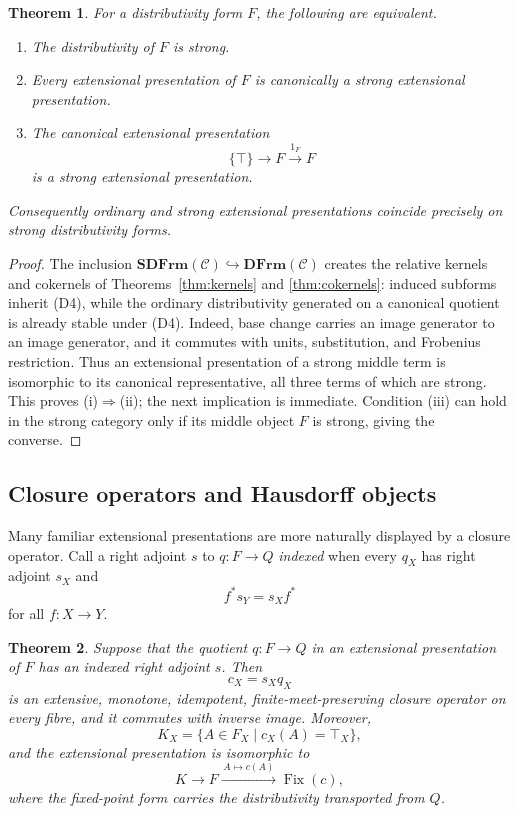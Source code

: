 \documentclass[12pt,oneside,reqno]{amsart}
\newtheorem{theorem}{Theorem}[section]
\theoremstyle{definition}
\theoremstyle{remark}
\newcommand{\C}{\mathcal C}
\newcommand{\DFrm}{\mathbf{DFrm}}
\newcommand{\SDFrm}{\mathbf{SDFrm}}
\begin{document}
\begin{theorem}\label{thm:ordinary-strong-presentations}
For a distributivity form \(F\), the following are equivalent.
\begin{enumerate}[label=\textup{(\roman*)}]
\item The distributivity of \(F\) is strong.
\item Every extensional presentation of \(F\) is canonically a strong
extensional presentation.
\item The canonical extensional presentation
\[
       \{\top\}\longrightarrow F\xrightarrow{1_F}F
\]
is a strong extensional presentation.
\end{enumerate}
Consequently ordinary and strong extensional presentations coincide
precisely on strong distributivity forms.
\end{theorem}

\begin{proof}
The inclusion \(\SDFrm(\C)\hookrightarrow\DFrm(\C)\) creates the
relative kernels and cokernels of Theorems~\ref{thm:kernels} and
\ref{thm:cokernels}: induced subforms inherit (D4), while the ordinary
distributivity generated on a canonical quotient is already stable
under (D4).  Indeed, base change carries an image generator to an image
generator, and it commutes with units, substitution, and Frobenius
restriction.  Thus an
extensional presentation of a strong middle term is isomorphic to its
canonical representative, all three terms of which are strong.  This
proves \textup{(i)}\(\Rightarrow\)\textup{(ii)}; the next implication is
immediate.  Condition \textup{(iii)} can hold in the strong category
only if its middle object \(F\) is strong, giving the converse.
\end{proof}

\subsection{Closure operators and Hausdorff objects}

Many familiar extensional presentations are more naturally displayed
by a closure operator.  Call a right adjoint \(s\) to \(q:F\to Q\)
\emph{indexed} when every \(q_X\) has right adjoint \(s_X\) and
\[
                         f^*s_Y=s_Xf^*
\]
for all \(f:X\to Y\).

\begin{theorem}\label{thm:adjoint-closure}
Suppose that the quotient \(q:F\to Q\) in an extensional presentation
of \(F\) has an indexed right adjoint \(s\).  Then
\[
                          c_X=s_Xq_X
\]
is an extensive, monotone, idempotent, finite-meet-preserving closure
operator on every fibre, and it commutes with inverse image.  Moreover,
\[
 K_X=\{A\in F_X\mid c_X(A)=\top_X\},
\]
and the extensional presentation is isomorphic to
\begin{equation}\label{eq:closure-extensional-presentation}
 K\longrightarrow F
  \xrightarrow{\,A\mapsto c(A)\,}\operatorname{Fix}(c),
\end{equation}
where the fixed-point form carries the distributivity transported from
\(Q\).
\end{theorem}
\end{document}
